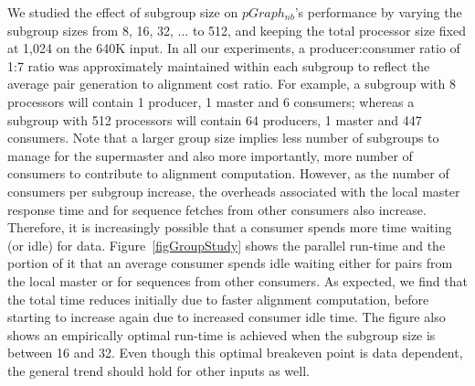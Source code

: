 \documentclass[10pt,journal,letterpaper,compsoc]{IEEEtran}
\begin{document}
We studied the effect of subgroup size on $pGraph_{nb}$'s performance by varying the subgroup sizes from 8, 16, 32, $\ldots$ to  512, and keeping the total processor size fixed at 1,024 on the 640K input. In all our experiments, a producer:consumer ratio of 1:7 ratio was approximately maintained within each subgroup to reflect the average pair generation to alignment cost ratio. For example, a subgroup with 8 processors will contain 1 producer, 1 master and 6 consumers; whereas a subgroup with 512 processors will contain 64 producers, 1 master and 447 consumers. Note that a larger group size implies less number of subgroups to manage for the supermaster and also more importantly, more number of consumers to contribute to alignment computation. However, as the number of consumers per subgroup increase, the overheads associated with the local master response time and for sequence fetches from other consumers also increase. Therefore, it is increasingly possible that a consumer spends more time waiting (or idle) for data.  Figure~\ref{figGroupStudy} shows the parallel run-time and the portion of it that an average consumer spends idle waiting either for pairs from the local master or for sequences from other consumers. As expected, we find that the total time reduces initially due to faster alignment computation, before starting to increase again due to increased consumer idle time. The figure also shows an empirically optimal run-time is achieved when the subgroup size is between 16 and 32. Even though this optimal breakeven point is data dependent, the general trend should hold for other inputs as well.
\end{document}
